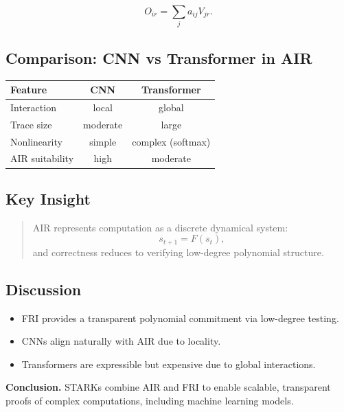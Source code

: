 \[
O_{ir} = \sum_j a_{ij} V_{jr}.
\]

\subsection{Comparison: CNN vs Transformer in AIR}

\begin{center}
\begin{tabular}{l|c|c}
Feature & CNN & Transformer \\
\hline
Interaction & local & global \\
Trace size & moderate & large \\
Nonlinearity & simple & complex (softmax) \\
AIR suitability & high & moderate
\end{tabular}
\end{center}

\subsection{Key Insight}

\begin{quote}
AIR represents computation as a discrete dynamical system:
\[
s_{t+1} = F(s_t),
\]
and correctness reduces to verifying low-degree polynomial structure.
\end{quote}

\subsection{Discussion}

\begin{itemize}
\item FRI provides a transparent polynomial commitment via low-degree testing.
\item CNNs align naturally with AIR due to locality.
\item Transformers are expressible but expensive due to global interactions.
\end{itemize}

\medskip

\noindent
\textbf{Conclusion.}  
STARKs combine AIR and FRI to enable scalable, transparent proofs of complex computations, including machine learning models.